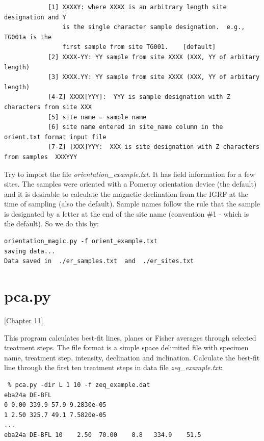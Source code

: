 \documentclass[11pt]{book}
\begin{document}
{{\begin{verbatim}
            [1] XXXXY: where XXXX is an arbitrary length site designation and Y
                is the single character sample designation.  e.g., TG001a is the
                first sample from site TG001.    [default]
            [2] XXXX-YY: YY sample from site XXXX (XXX, YY of arbitary length)
            [3] XXXX.YY: YY sample from site XXXX (XXX, YY of arbitary length)
            [4-Z] XXXX[YYY]:  YYY is sample designation with Z characters from site XXX
            [5] site name = sample name
            [6] site name entered in site_name column in the orient.txt format input file  
            [7-Z] [XXX]YYY:  XXX is site designation with Z characters from samples  XXXYYY
\end{verbatim}
     
  Try to import the file {\it orientation\_example.txt}.  It has field information for a few sites.  The samples were oriented with a Pomeroy orientation device  (the default) and it is desirable to calculate the magnetic declination from the IGRF at the time of sampling (also the default).  Sample names follow the rule that the sample is designated by a letter at the end of the site name (convention \#1 - which is the default).  So we do this by:
  
  \begin{verbatim}
orientation_magic.py -f orient_example.txt 
saving data...
Data saved in  ./er_samples.txt  and  ./er_sites.txt

\end{verbatim}

%
\section{pca.py} 
\href{http://Webbook2.html/#Fisher_statistics}{[Chapter 11]}

This program calculates best-fit lines, planes or Fisher averages through selected treatment steps.  The file format is 
a simple space delimited file with specimen name, treatment step,  intensity, declination and inclination.  Calculate the best-fit 
line through the first ten treatment steps in data file {\it zeq\_example.txt}:  
  
 \begin{verbatim}
 % pca.py -dir L 1 10 -f zeq_example.dat
eba24a DE-BFL
0 0.00 339.9 57.9 9.2830e-05
1 2.50 325.7 49.1 7.5820e-05
...
eba24a DE-BFL 10    2.50  70.00    8.8   334.9    51.5
\end{verbatim}
 
}}
\end{document}
